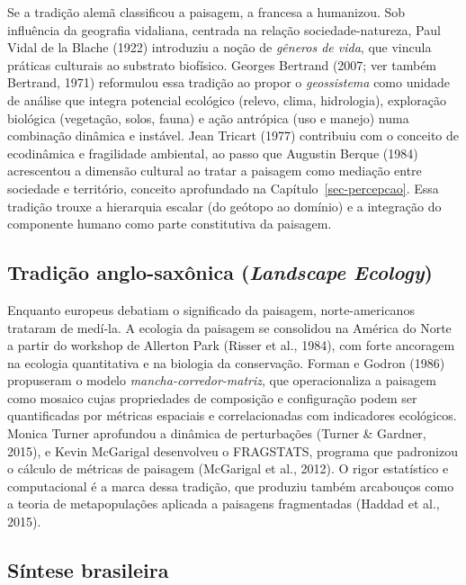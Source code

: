 \documentclass[
  portuguese,
  11pt,
  a4paper,
  open=any]{scrbook}
\begin{document}
Se a tradição alemã classificou a paisagem, a francesa a humanizou. Sob
influência da geografia vidaliana, centrada na relação
sociedade-natureza, Paul Vidal de la Blache (1922) introduziu a noção de
\emph{gêneros de vida}, que vincula práticas culturais ao substrato
biofísico. Georges Bertrand (2007; ver também Bertrand, 1971) reformulou
essa tradição ao propor o \emph{geossistema} como unidade de análise que
integra potencial ecológico (relevo, clima, hidrologia), exploração
biológica (vegetação, solos, fauna) e ação antrópica (uso e manejo) numa
combinação dinâmica e instável. Jean Tricart (1977) contribuiu com o
conceito de ecodinâmica e fragilidade ambiental, ao passo que Augustin
Berque (1984) acrescentou a dimensão cultural ao tratar a paisagem como
mediação entre sociedade e território, conceito aprofundado na
Capítulo~\ref{sec-percepcao}. Essa tradição trouxe a hierarquia escalar
(do geótopo ao domínio) e a integração do componente humano como parte
constitutiva da paisagem.

\subsection{\texorpdfstring{Tradição anglo-saxônica (\emph{Landscape
Ecology})}{Tradição anglo-saxônica (Landscape Ecology)}}\label{tradiuxe7uxe3o-anglo-saxuxf4nica-landscape-ecology}

Enquanto europeus debatiam o significado da paisagem, norte-americanos
trataram de medí-la. A ecologia da paisagem se consolidou na América do
Norte a partir do workshop de Allerton Park (Risser et al., 1984), com
forte ancoragem na ecologia quantitativa e na biologia da conservação.
Forman e Godron (1986) propuseram o modelo
\emph{mancha-corredor-matriz}, que operacionaliza a paisagem como
mosaico cujas propriedades de composição e configuração podem ser
quantificadas por métricas espaciais e correlacionadas com indicadores
ecológicos. Monica Turner aprofundou a dinâmica de perturbações (Turner
\& Gardner, 2015), e Kevin McGarigal desenvolveu o FRAGSTATS, programa
que padronizou o cálculo de métricas de paisagem (McGarigal et al.,
2012). O rigor estatístico e computacional é a marca dessa tradição, que
produziu também arcabouços como a teoria de metapopulações aplicada a
paisagens fragmentadas (Haddad et al., 2015).

\subsection{Síntese brasileira}\label{suxedntese-brasileira}
\end{document}
